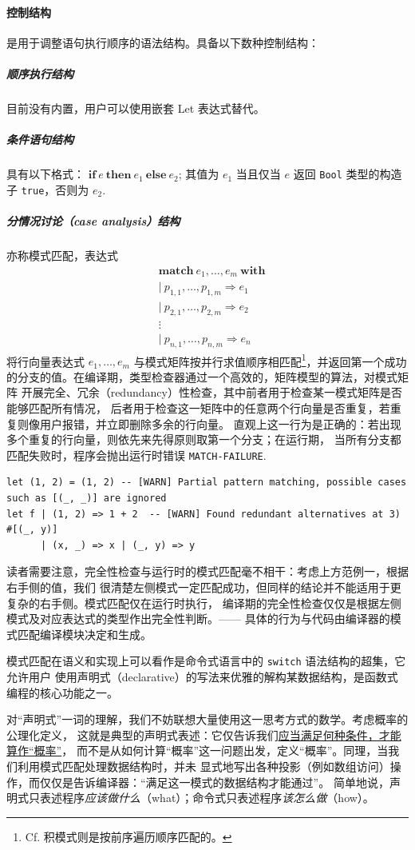 \documentclass[a4paper, 11pt]{article}
\theoremstyle{remark}\newtheorem*{remark}{Remark}
\theoremstyle{definition}\newtheorem*{definition}{Definition}
\begin{document}
\paragraph{控制结构} 是用于调整语句执行顺序的语法结构。\Tigris 具备以下数种控制结构：
\subparagraph{顺序执行结构} 目前没有内置，用户可以使用嵌套 Let 表达式替代。
\subparagraph{条件语句结构} 具有以下格式：
\(\mathbf{if}\ e\ \mathbf{then}\ e_1\ \mathbf{else}\ e_2\); 其值为 \(e_1\) 当且仅当 \(e\)
返回 \texttt{Bool} 类型的构造子 \texttt{true}，否则为 \(e_2\).
\subparagraph{分情况讨论（case analysis）结构} 亦称模式匹配，表达式
\begin{align*}
  &\mathbf{match}\ e_1,\dots, e_m\ \mathbf{with}\\
  &\vert\ p_{1,1},\dots,p_{1,m}\Rightarrow e_1 \\
  &\vert\ p_{2,1},\dots,p_{2,m}\Rightarrow e_{2}\\
  &\vdots\\
  &\vert\ p_{n,1},\dots,p_{n,m}\Rightarrow e_{n}
\end{align*}
将行向量表达式 $e_1,\dots, e_m$ 与模式矩阵按并行求值顺序相匹配\footnote{
  Cf. 积模式则是按前序遍历顺序匹配的。
}，并返回第一个成功的分支的值。在编译期，类型检查器通过一个高效的，矩阵模型的算法，对模式矩阵
开展完全、冗余（redundancy）性检查，其中前者用于检查某一模式矩阵是否能够匹配所有情况，
后者用于检查这一矩阵中的任意两个行向量是否重复，若重复则像用户报错，并立即删除多余的行向量。
直观上这一行为是正确的：若出现多个重复的行向量，则依先来先得原则取第一个分支；在运行期，
当所有分支都匹配失败时，程序会抛出运行时错误 \texttt{MATCH-FAILURE}.
\begin{verbatim}
let (1, 2) = (1, 2) -- [WARN] Partial pattern matching, possible cases such as [(_, _)] are ignored
let f | (1, 2) => 1 + 2  -- [WARN] Found redundant alternatives at 3)  #[(_, y)]
      | (x, _) => x | (_, y) => y
\end{verbatim}
读者需要注意，完全性检查与运行时的模式匹配毫不相干：考虑上方范例一，根据右手侧的值，我们
很清楚左侧模式一定匹配成功，但同样的结论并不能适用于更复杂的右手侧。模式匹配仅在运行时执行，
编译期的完全性检查仅仅是根据左侧模式及对应表达式的类型作出完全性判断。——
具体的行为与代码由编译器的模式匹配编译模块决定和生成。

模式匹配在语义和实现上可以看作是命令式语言中的 \texttt{switch} 语法结构的超集，它允许用户
使用声明式（declarative）的写法来优雅的解构某数据结构，是函数式编程的核心功能之一。

对“声明式”一词的理解，我们不妨联想大量使用这一思考方式的数学。考虑概率的公理化定义，
这就是典型的声明式表述：它仅告诉我们\underline{应当满足何种条件，才能算作“概率”}，
而不是从如何计算“概率”这一问题出发，定义“概率”。同理，当我们利用模式匹配处理数据结构时，并未
显式地写出各种投影（例如数组访问）操作，而仅仅是告诉编译器：“满足这一模式的数据结构才能通过”。
简单地说，声明式只表述程序\emph{应该做什么}（what）；命令式只表述程序\emph{该怎么做}（how）。
\end{document}
